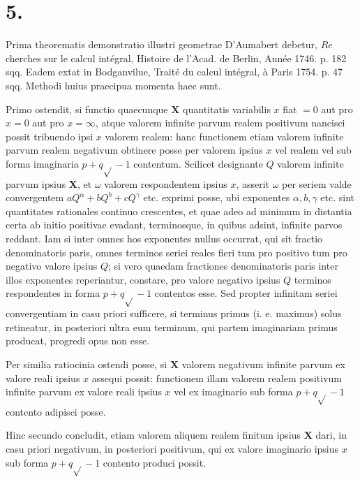 \documentclass[twoside,12pt, showframe]{memoir}
\begin{document}
\section*{5.}
Prima theorematis demonstratio illustri geometrae D'Aumabert debetur, \(R e\) cherches sur le calcul intégral, Histoire de l'Acad. de Berlin, Année 1746. p. 182 sqq. Eadem extat in Bodganvilue, Traité du calcul intégral, à Paris 1754. p. 47 sqq. Methodi huius praecipua momenta haec sunt.

Primo ostendit, si functio quaecunque \(\boldsymbol{X}\) quantitatis variabilis \(x\) fiat \(=0\) aut pro \(x=0\) aut pro \(x=\infty\), atque valorem infinite parvum realem positivum nancisci possit tribuendo ipsi \(x\) valorem realem: hanc functionem etiam valorem infinite parvum realem negativum obtinere posse per valorem ipsius \(x\) vel realem vel sub forma imaginaria \(p+q \sqrt{ }-1\) contentum. Scilicet designante \(Q\) valorem infinite parvum ipsius \(\boldsymbol{X}\), et \(\omega\) valorem respondentem ipsius \(x\), asserit \(\omega\) per seriem valde convergentem \(a Q^{\alpha}+b Q^{b}+c Q^{\gamma}\) etc. exprimi posse, ubi exponentes \(\alpha, b, \gamma\) etc. sint quantitates rationales continuo crescentes, et quae adeo ad minimum in distantia certa ab initio positivae evadant, terminosque, in quibus adsint, infinite parvos reddant. Iam si inter omnes hos exponentes nullus occurrat, qui sit fractio denominatoris paris, omnes terminos seriei reales fieri tum pro positivo tum pro negativo valore ipsius \(Q\); si vero quaedam fractiones denominatoris paris inter illos exponentes reperiantur, constare, pro valore negativo ipsius \(Q\) terminos respondentes in forma \(p+q \sqrt{ }-1\) contentos esse. Sed propter infinitam seriei convergentiam in casu priori sufficere, si terminus primus (i. e. maximus) solus retineatur, in posteriori ultra eum terminum, qui partem imaginariam primus producat, progredi opus non esse.

Per similia ratiocinia ostendi posse, si \(\boldsymbol{X}\) valorem negativum infinite parvum ex valore reali ipsius \(x\) assequi possit: functionem illam valorem realem positivum infinite parvum ex valore reali ipsius \(x\) vel ex imaginario sub forma \(p+q \sqrt{ }-1\) contento adipisci posse.

Hinc secundo concludit, etiam valorem aliquem realem finitum ipsius \(\boldsymbol{X}\) dari, in casu priori negativum, in posteriori positivum, qui ex valore imaginario ipsius \(x\) sub forma \(p+q \sqrt{ }-1\) contento produci possit.
\end{document}
